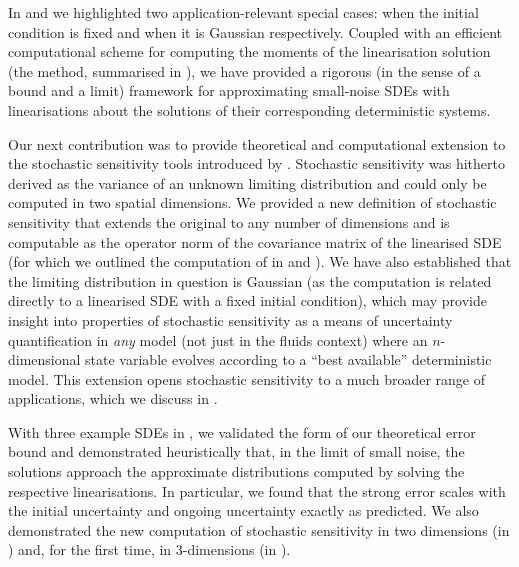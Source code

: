 In  and  we highlighted two application-relevant special cases: when the initial condition is fixed and when it is Gaussian respectively.
Coupled with an efficient computational scheme for computing the moments of the linearisation solution (the \citet{Mazzoni_2008_ComputationalAspectsContinuous} method, summarised in ), we have provided a rigorous (in the sense of a bound and a limit) framework for approximating small-noise SDEs with linearisations about the solutions of their corresponding deterministic systems.

Our next contribution was to provide theoretical and computational extension to the stochastic sensitivity tools introduced by \citet{Balasuriya_2020_StochasticSensitivityComputable}.
Stochastic sensitivity was hitherto derived as the variance of an unknown limiting distribution and could only be computed in two spatial dimensions.
We provided a new definition of stochastic sensitivity that extends the original to any number of dimensions and is computable as the operator norm of the covariance matrix of the linearised SDE (for which we outlined the computation of in  and ).
We have also established that the limiting distribution in question is Gaussian (as the computation is related directly to a linearised SDE with a fixed initial condition), which may provide insight into properties of stochastic sensitivity as a means of uncertainty quantification in \emph{any} model (not just in the fluids context) where an \(n\)-dimensional state variable evolves according to a ``best available'' deterministic model.
This extension opens stochastic sensitivity to a much broader range of applications, which we discuss in .

With three example SDEs in , we validated the form of our theoretical error bound and demonstrated heuristically that, in the limit of small noise, the solutions approach the approximate distributions computed by solving the respective linearisations.
In particular, we found that the strong error scales with the initial uncertainty and ongoing uncertainty exactly as predicted.
We also demonstrated the new computation of stochastic sensitivity in two dimensions (in ) and, for the first time, in 3-dimensions (in ).

